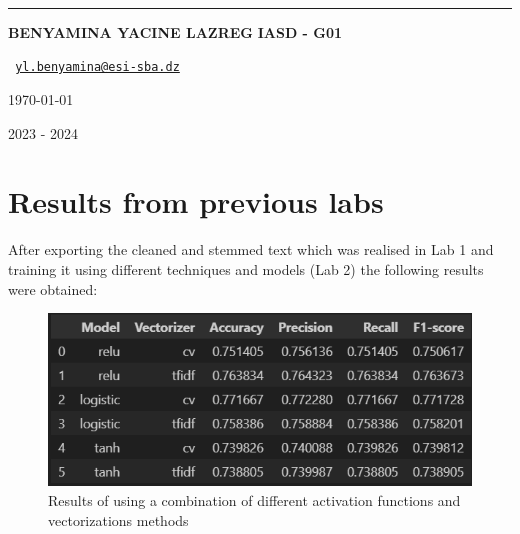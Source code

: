\documentclass[12pt, a4paper]{article}
\begin{document}
\begin{titlepage}



\begin{minipage}[t]{\linewidth}
\centering
{} \\
 \\
 \\
\end{minipage}
\vspace{12pt}
\hrule


\vspace{4cm}

\begin{center}

\vspace{2.5cm}


\huge{}

\vspace{0.5cm}

\normalsize
\uppercase{\textbf{Benyamina Yacine Lazreg}}
\normalsize
\uppercase{\textbf{IASD - G01}}

\texttt{
\href{mailto:yl.benyamina@esi-sba.dz}{yl.benyamina@esi-sba.dz}
}

\today

\vspace{2.5cm}


\vfill

\large
2023 - 2024 \\


\end{center}
\end{titlepage}


\thispagestyle{empty}
\clearpage

\section {Results from previous labs}

After exporting the cleaned and stemmed text which was realised in Lab 1 and training it using different techniques and models (Lab 2) the following results were obtained:

\begin{figure}[H]
    \centering
    \includegraphics[width=0.5\linewidth]{df1.png}
    \caption{Results of using a combination of different activation functions and vectorizations methods}
    \label{fig:enter-label}
\end{figure}
\end{document}
